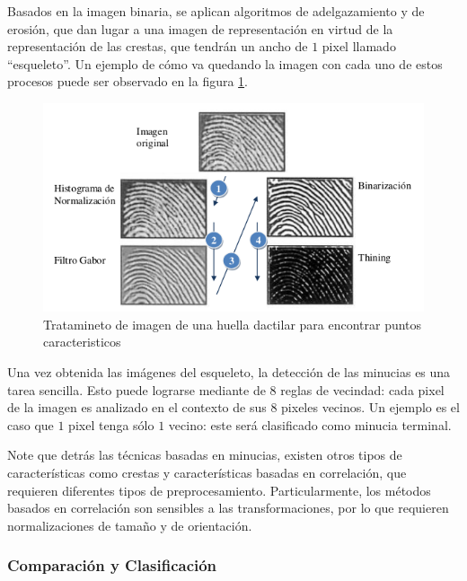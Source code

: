 Basados en la imagen binaria, se aplican algoritmos de adelgazamiento y de erosión, que dan lugar a una imagen de representación en virtud de la representación de las crestas, que tendrán un ancho de $1$ pixel llamado ``esqueleto''. Un ejemplo de cómo va quedando la imagen con cada uno de estos procesos puede ser observado en la figura \ref{tratamiento}.


\begin{figure}[H]
\centering
\includegraphics{images/capitulo2/tratamiento.png}
\caption{Tratamineto de imagen de una huella dactilar para encontrar puntos caracteristicos}
\label{tratamiento}
\end{figure}


Una vez obtenida las imágenes del esqueleto, la detección de las minucias es una tarea sencilla. Esto puede lograrse mediante de $8$ reglas de vecindad: cada pixel de la imagen es analizado en el contexto de sus $8$ pixeles vecinos. Un ejemplo es el caso que $1$ pixel tenga sólo $1$ vecino: este será clasificado como minucia terminal.


Note que detrás las técnicas basadas en minucias, existen otros tipos de características como crestas y características basadas en correlación, que requieren diferentes tipos de preprocesamiento. Particularmente, los métodos basados en correlación son sensibles a las transformaciones, por lo que requieren normalizaciones de tamaño y de orientación.


 \subsubsection*{Comparación y Clasificación}

